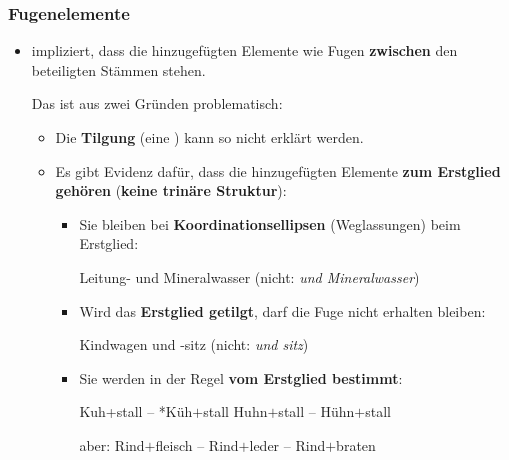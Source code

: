 \begin{frame}
\frametitle{Fugenelemente}

\begin{itemize}
	\item {} impliziert, dass die hinzugefügten Elemente wie Fugen \textbf{zwischen} den beteiligten Stämmen stehen. 
	
\medskip 
	
	Das ist aus zwei Gründen problematisch:

	\begin{itemize}
		\item Die \textbf{Tilgung} (eine ) kann so nicht erklärt werden.
		\item Es gibt Evidenz dafür, dass die hinzugefügten Elemente \textbf{zum Erstglied gehören} (\dash \textbf{keine trinäre Struktur}):

\pause 

\medskip 
	
	\begin{itemize}
		\item Sie bleiben bei \textbf{Koordinationsellipsen} (Weglassungen) beim Erstglied:
		
		\ea Leitung- und Mineral\alertred{\_}wasser (nicht: \emph{und Mineralwasser})
		\z

\pause 
		
		\item Wird das \textbf{Erstglied getilgt}, darf die Fuge nicht erhalten bleiben:
		
		\ea Kindwagen und -sitz (nicht: \emph{und sitz})
		\z

\pause 
		
		\item Sie werden in der Regel \textbf{vom Erstglied bestimmt}:
		
		\ea Kuh\alertred{\_}+stall -- *Küh$+$stall \vs *Huhn\alertred{\_}$+$stall -- Hühn$+$stall
		\z
		
		\ea aber: Rind\alertred{\_}$+$fleisch -- Rind$+$leder -- Rind$+$braten
		\z
		
	\end{itemize}


\end{itemize}
\end{itemize}
\end{frame}


